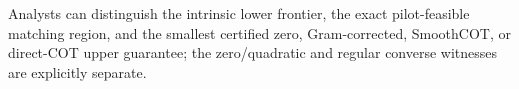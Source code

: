 Analysts can distinguish the intrinsic lower frontier, the exact pilot-feasible matching region, and the smallest certified zero, Gram-corrected, SmoothCOT, or direct-COT upper guarantee; the zero/quadratic and regular converse witnesses are explicitly separate.